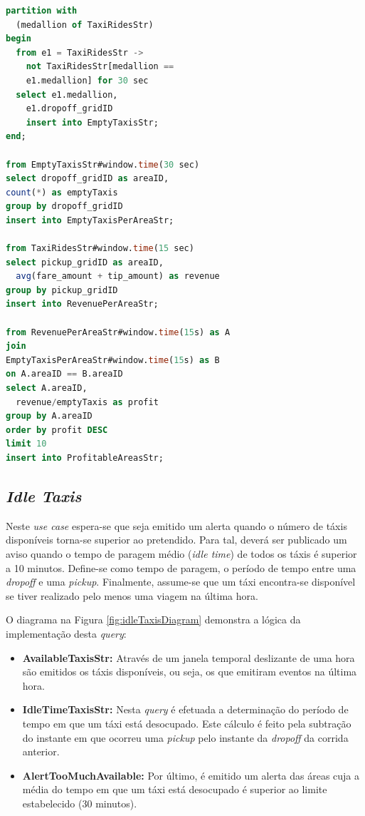 \documentclass[article]{IEEEtran}
\begin{document}
\begin{lstlisting}[language=SQL]
partition with 
  (medallion of TaxiRidesStr)
begin
  from e1 = TaxiRidesStr ->
    not TaxiRidesStr[medallion == 
    e1.medallion] for 30 sec
  select e1.medallion, 
    e1.dropoff_gridID
    insert into EmptyTaxisStr;
end;

from EmptyTaxisStr#window.time(30 sec)
select dropoff_gridID as areaID,
count(*) as emptyTaxis
group by dropoff_gridID
insert into EmptyTaxisPerAreaStr;

from TaxiRidesStr#window.time(15 sec)
select pickup_gridID as areaID,
  avg(fare_amount + tip_amount) as revenue
group by pickup_gridID
insert into RevenuePerAreaStr;

from RevenuePerAreaStr#window.time(15s) as A 
join
EmptyTaxisPerAreaStr#window.time(15s) as B 
on A.areaID == B.areaID
select A.areaID,
  revenue/emptyTaxis as profit
group by A.areaID
order by profit DESC
limit 10
insert into ProfitableAreasStr;
\end{lstlisting}

\subsection{\textit{Idle Taxis}}

Neste \textit{use case} espera-se que seja emitido um alerta quando o número de táxis disponíveis torna-se superior ao pretendido. Para tal, deverá ser publicado um aviso quando o tempo de paragem médio (\textit{idle time}) de todos os táxis é superior a 10 minutos. Define-se como tempo de paragem, o período de tempo entre uma \textit{dropoff} e uma \textit{pickup}. Finalmente, assume-se que um táxi encontra-se disponível se tiver realizado pelo menos uma viagem na última hora.

O diagrama na Figura \ref{fig:idleTaxisDiagram} demonstra a lógica da implementação desta \textit{query}:
\begin{itemize}
    \item \textbf{AvailableTaxisStr:} Através de um janela temporal deslizante de uma hora são emitidos os táxis disponíveis, ou seja, os que emitiram eventos na última hora.
    \item \textbf{IdleTimeTaxisStr:} Nesta \textit{query} é efetuada a determinação do período de tempo em que um táxi está desocupado. Este cálculo é feito pela subtração do instante em que ocorreu uma \textit{pickup} pelo instante da \textit{dropoff} da corrida anterior.
    \item \textbf{AlertTooMuchAvailable:} Por último, é emitido um alerta das áreas cuja a média do tempo em que um táxi está desocupado é superior ao limite estabelecido (30 minutos).
\end{itemize}
\end{document}
